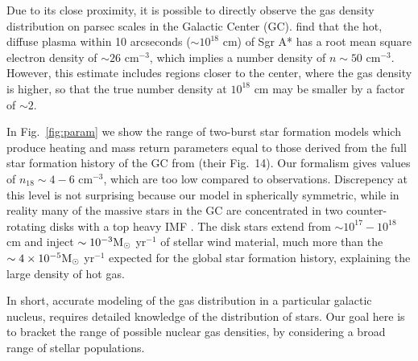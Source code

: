 \documentclass[usenatbib,fleqn]{mnras}
\newcommand{\Msun}{{\rm M_\odot}}
\begin{document}
Due to its close proximity, it is possible to directly observe the gas
density distribution on parsec scales in the Galactic Center
(GC). \citet{Baganoff+2003} find that the hot, diffuse plasma within
10 arcseconds ($\sim 10^{18}$ cm) of Sgr A* has a root mean square
electron density of $\sim 26$ cm$^{-3}$, which implies a number
density of $n\sim 50$ cm$^{-3}$. However, this estimate includes
regions closer to the center, where the gas density is higher, so that
the true number density at $10^{18}$ cm may be smaller by a factor of
$\sim 2$.

In Fig.~\ref{fig:param} we show the range of two-burst star formation
models which produce heating and mass return parameters equal to those
derived from the full star formation history of the GC from
\citet{Pfuhl+2011} (their Fig.~14).  Our formalism gives values of
$n_{18}\sim 4-6$ cm$^{-3}$, which are too low compared to
observations.  Discrepency at this level is not surprising because our
model in spherically symmetric, while in reality many of the massive
stars in the GC are concentrated in two counter-rotating disks
\citep{Genzel+2003} with a top heavy IMF \citep{Bartko+2010}.  The
disk stars extend from $\sim 10^{17}-10^{18}$ cm and inject $\sim
10^{-3} \Msun$ yr$^{-1}$ of stellar wind material, much more than the
$\sim 4 \times 10^{-5} \Msun$ yr$^{-1}$ expected for the global star
formation history, explaining the large density of hot gas.

In short, accurate modeling of the gas distribution in a particular
galactic nucleus, requires detailed knowledge of the distribution of
stars. Our goal here is to bracket the range of possible nuclear gas
densities, by considering a broad range of stellar populations.


\end{document}
